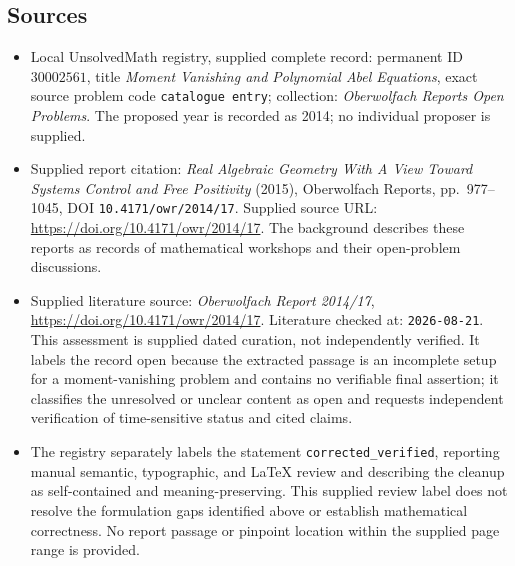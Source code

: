 \documentclass[11pt]{article}
\begin{document}
\subsection{Sources}
\begin{itemize}
\item Local UnsolvedMath registry, supplied complete record: permanent ID \(30002561\), title \emph{Moment Vanishing and Polynomial Abel Equations}, exact source problem code \texttt{catalogue entry}; collection: \emph{Oberwolfach Reports Open Problems}. The proposed year is recorded as 2014; no individual proposer is supplied.
\item Supplied report citation: \emph{Real Algebraic Geometry With A View Toward Systems Control and Free Positivity} (2015), Oberwolfach Reports, pp.\ 977--1045, DOI \texttt{10.4171/owr/2014/17}. Supplied source URL: \url{https://doi.org/10.4171/owr/2014/17}. The background describes these reports as records of mathematical workshops and their open-problem discussions.
\item Supplied literature source: \emph{Oberwolfach Report 2014/17}, \url{https://doi.org/10.4171/owr/2014/17}. Literature checked at: \texttt{2026-08-21}. This assessment is supplied dated curation, not independently verified. It labels the record open because the extracted passage is an incomplete setup for a moment-vanishing problem and contains no verifiable final assertion; it classifies the unresolved or unclear content as open and requests independent verification of time-sensitive status and cited claims.
\item The registry separately labels the statement \texttt{corrected\_verified}, reporting manual semantic, typographic, and LaTeX review and describing the cleanup as self-contained and meaning-preserving. This supplied review label does not resolve the formulation gaps identified above or establish mathematical correctness. No report passage or pinpoint location within the supplied page range is provided.
\end{itemize}
\end{document}
